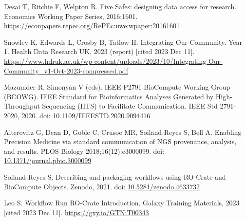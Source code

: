 \documentclass[10pt,letterpaper]{article}
\begin{document}
\begin{thebibliography}{10}
\begin{small}
Desai T, Ritchie F, Welpton R.
Five Safes: designing data access for research.
Economics Working Paper Series, 2016;1601.
\url{https://econpapers.repec.org/RePEc:uwe:wpaper:20161601}

Snowley K, Edwards L, Crosby B, Tatlow H.
Integrating Our Community. Year 1.
Health Data Research UK, 2023 (report) [cited 2023 Dec 11].
\url{https://www.hdruk.ac.uk/wp-content/uploads/2023/10/Integrating-Our-Community_v1-Oct-2023-compressed.pdf}

Mazumder R, Simonyan V (eds). IEEE P2791 BioCompute Working Group (BCOWG).
IEEE Standard for Bioinformatics Analyses Generated by High-Throughput Sequencing (HTS) to Facilitate Communication.
IEEE Std 2791-2020, 2020.
doi: \href{https://doi.org/10.1109/IEEESTD.2020.9094416}{10.1109/IEEESTD.2020.9094416}

Alterovitz G, Dean D, Goble C, Crusoe MR, Soiland-Reyes S, Bell A.
Enabling Precision Medicine via standard communication of NGS provenance, analysis, and results.
PLOS Biology 2018;16(12):e3000099.
doi: \href{https://doi.org/10.1371/journal.pbio.3000099}{10.1371/journal.pbio.3000099}

Soiland-Reyes S.
Describing and packaging workflows using RO-Crate and BioCompute Objects.
Zenodo, 2021.
doi: \href{https://doi.org/10.5281/zenodo.4633732}{10.5281/zenodo.4633732}

Leo S.
Workflow Run RO-Crate Introduction.
Galaxy Training Materials, 2023 [cited 2023 Dec 11].
\url{https://gxy.io/GTN:T00343}








\end{small}


\end{thebibliography}
\end{document}
